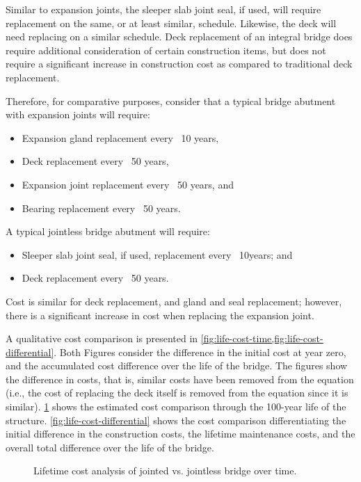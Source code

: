 Similar to expansion joints, the sleeper slab joint seal, if used, will require replacement on the same, or at least
similar, schedule. Likewise, the deck will need replacing on a similar schedule. Deck replacement of an integral
bridge does require additional consideration of certain construction items, but does not require a significant increase
in construction cost as compared to traditional deck replacement.

Therefore, for comparative purposes, consider that a typical bridge abutment with expansion joints will require:

\begin{itemize}
  \item Expansion gland replacement every ~10 years,
  \item Deck replacement every ~50 years,
  \item Expansion joint replacement every ~50 years, and
  \item Bearing replacement every ~50 years.
\end{itemize}

A typical jointless bridge abutment will require:

\begin{itemize}
  \item Sleeper slab joint seal, if used, replacement every ~10years; and
  \item Deck replacement every ~50 years.
\end{itemize}

Cost is similar for deck replacement, and gland and seal replacement; however, there is a significant increase in
cost when replacing the expansion joint.

A qualitative cost comparison is presented in \cref{fig:life-cost-time,fig:life-cost-differential}. Both Figures consider the difference in the initial cost at year zero, and the accumulated cost difference over the life of the bridge. The figures show the difference in costs, that is, similar costs have been removed from the equation (i.e., the cost of replacing the deck itself is removed from the equation since it is similar). \cref{fig:life-cost-time} shows the estimated cost comparison through the 100-year life of the structure. \cref{fig:life-cost-differential} shows the cost comparison differentiating the initial difference in the construction costs, the lifetime maintenance costs, and the overall total difference over the life of the bridge.

\begin{figure}
  \caption{Lifetime cost analysis of jointed vs. jointless bridge over time.}\label{fig:life-cost-time}
\end{figure}

